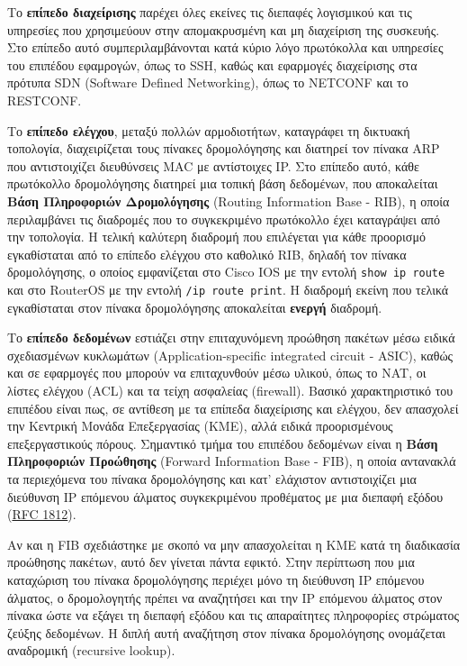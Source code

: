 \documentclass{EdipyLabs} %
\begin{document}
Το \textbf{επίπεδο διαχείρισης} παρέχει όλες εκείνες τις διεπαφές λογισμικού και τις υπηρεσίες που χρησιμεύουν στην απομακρυσμένη και μη διαχείριση της συσκευής. Στο επίπεδο αυτό συμπεριλαμβάνονται κατά κύριο λόγο πρωτόκολλα και υπηρεσίες του επιπέδου εφαμρογών, όπως το SSH, καθώς και εφαρμογές διαχείρισης στα πρότυπα SDN (Software Defined Networking), όπως το NETCONF και το RESTCONF.

Το \textbf{επίπεδο ελέγχου}, μεταξύ πολλών αρμοδιοτήτων, καταγράφει τη δικτυακή τοπολογία, διαχειρίζεται τους πίνακες δρομολόγησης και διατηρεί τον πίνακα ARP που αντιστοιχίζει διευθύνσεις MAC με αντίστοιχες IP. Στο επίπεδο αυτό, κάθε πρωτόκολλο δρομολόγησης διατηρεί μια τοπική βάση δεδομένων, που αποκαλείται \textbf{Βάση Πληροφοριών Δρομολόγησης} (Routing Information Base - RIB), η οποία περιλαμβάνει τις διαδρομές που το συγκεκριμένο πρωτόκολλο έχει καταγράψει από την τοπολογία. Η τελική καλύτερη διαδρομή που επιλέγεται για κάθε προορισμό εγκαθίσταται από το επίπεδο ελέγχου στο καθολικό RIB, δηλαδή τον πίνακα δρομολόγησης, ο οποίος εμφανίζεται στο Cisco IOS με την εντολή \texttt{show ip route} και στο RouterOS με την εντολή \texttt{/ip route print}. Η διαδρομή εκείνη που τελικά εγκαθίσταται στον πίνακα δρομολόγησης αποκαλείται \textbf{ενεργή} διαδρομή.

Το \textbf{επίπεδο δεδομένων} εστιάζει στην επιταχυνόμενη προώθηση πακέτων μέσω ειδικά σχεδιασμένων κυκλωμάτων (Application-specific integrated circuit - ASIC), καθώς και σε εφαρμογές που μπορούν να επιταχυνθούν μέσω υλικού, όπως το NAT, οι λίστες ελέγχου (ACL) και τα τείχη ασφαλείας (firewall). Βασικό χαρακτηριστικό του επιπέδου είναι πως, σε αντίθεση με τα επίπεδα διαχείρισης και ελέγχου, δεν απασχολεί την Κεντρική Μονάδα Επεξεργασίας (ΚΜΕ), αλλά ειδικά προορισμένους επεξεργαστικούς πόρους. Σημαντικό τμήμα του επιπέδου δεδομένων είναι η \textbf{Βάση Πληροφοριών Προώθησης} (Forward Information Base - FIB), η οποία αντανακλά τα περιεχόμενα του πίνακα δρομολόγησης και κατ' ελάχιστον αντιστοιχίζει μια διεύθυνση IP επόμενου άλματος συγκεκριμένου προθέματος με μια διεπαφή εξόδου (\href{https://tools.ietf.org/html/rfc1812}{RFC 1812}). 

Αν και η FIB σχεδιάστηκε με σκοπό να μην απασχολείται η ΚΜΕ κατά τη διαδικασία προώθησης πακέτων, αυτό δεν γίνεται πάντα εφικτό. Στην περίπτωση που μια καταχώριση του πίνακα δρομολόγησης περιέχει μόνο τη διεύθυνση IP επόμενου άλματος, ο δρομολογητής πρέπει να αναζητήσει και την IP επόμενου άλματος στον πίνακα ώστε να εξάγει τη διεπαφή εξόδου και τις απαραίτητες πληροφορίες στρώματος ζεύξης δεδομένων. Η διπλή αυτή αναζήτηση στον πίνακα δρομολόγησης ονομάζεται αναδρομική (recursive lookup).
\end{document}
